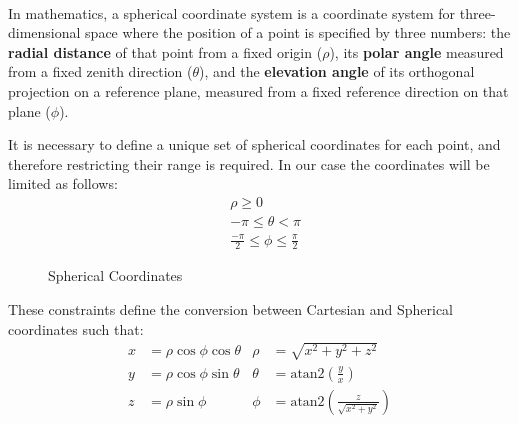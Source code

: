\paragraph{} In mathematics, a spherical coordinate system is a coordinate system for three-dimensional space where the position of a point is specified by three numbers: the \textbf{radial distance} of that point from a fixed origin ($\rho$), its \textbf{polar angle} measured from a fixed zenith direction ($\theta$), and the \textbf{elevation angle} of its orthogonal projection on a reference plane, measured from a fixed reference direction on that plane ($\phi$).

It is necessary to define a unique set of spherical coordinates for each point, and therefore restricting their range is required. In our case the coordinates will be limited as follows:
\begin{align*}
& \rho \geq 0 \\
& -\pi \leq \theta < \pi \\
& \frac{-\pi}{2} \leq \phi \leq \frac{\pi}{2}
\label{eq:los_distToHorizon}
\end{align*} 

\begin{figure}[H]
   \centering
     
    \label{fig:Spherical1}
    \caption{Spherical Coordinates}
\end{figure}

These constraints define the conversion between Cartesian and Spherical coordinates such that:
\begin{align*}
x &=  \rho\cos\phi\cos\theta  & \rho &= \sqrt{x^{2} + y^{2} + z^{2}} \\
y &= \rho\cos\phi\sin\theta   & \theta &= \text{atan2}\left(\frac{y}{x}\right)\\
z &= \rho\sin\phi       & \phi &=  \text{atan2}\left(\frac{z}{\sqrt{x^2 + y^2}}\right)
\label{eq:los_distToHorizon}
\end{align*} 